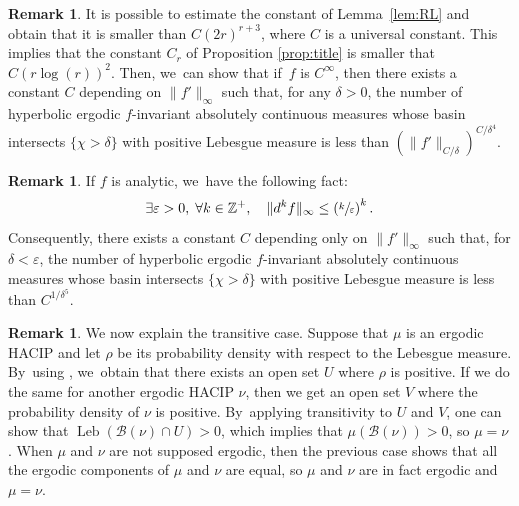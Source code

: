 \documentclass[11pt]{article}
\DeclareMathOperator{\Leb}{Leb}
\let\rC C
\theoremstyle{definition}
\newtheorem{rmq}[thm]{Remark}
\newcommand{\bbZ}{{\mathbb{Z}}}
\begin{document}
\begin{rmq}
It is possible to estimate the constant of Lemma~\ref{lem:RL} and obtain that it is smaller than $C (2r)^{r+3}$, where $C$ is a universal constant. This implies that the constant $C_r$ of Proposition \ref{prop:title} is smaller that $C (r \log(r))^2$. Then, we~can show that if~$f$ is $\rC^{\infty}$, then there exists a constant $C$ depending on $\| f' \|_{\infty}$ such that, for any $\delta > 0$, the number of hyperbolic ergodic $f$\nobreakdash-invariant absolutely continuous measures whose basin intersects $\{ \chi > \delta \}$ with positive Lebesgue measure is less than
$
\left (\| f' \|_{C/\delta} \right)^{C / \delta^4}
$.
\end{rmq}

\begin{rmq}
\label{rmq:analytic}
If $f$ is analytic, we~have the following fact:
\[
\exists \varepsilon > 0,\; \forall k \in \bbZ^+,\quad \| d^k f\|_{\infty} \leq \left (\sfrac{k}{\varepsilon} \right)^k.
\]
Consequently, there exists a constant $C$ depending only on $\| f' \|_{\infty}$ such that, for $\delta < \varepsilon$, the number of hyperbolic ergodic $f$\nobreakdash-invariant absolutely continuous measures whose basin intersects $\{ \chi > \delta \}$ with positive Lebesgue measure is less than
$
C^{1 / \delta^5}
$.
\end{rmq}

\begin{rmq}
\label{rmq:trans}
We now explain the transitive case. Suppose that $\mu$ is an ergodic HACIP and let $\rho$ be its probability density with respect to the Lebesgue measure. By~using \cite[Lem.\,VII.9.1]{SETE}, we~obtain that there exists an open set $U$ where $\rho$ is positive.
If we do the same for another ergodic HACIP $\nu$, then we get an open set $V$ where the probability density of $\nu$ is positive. By~applying transitivity to $U$ and $V$, one can show that $\Leb(\mathcal{B}(\nu) \cap U) > 0$, which implies that $\mu(\mathcal{B}(\nu)) > 0$, so $\mu=\nu$.
When $\mu$ and $\nu$ are not supposed ergodic, then the previous case shows that all the ergodic components of $\mu$ and $\nu$ are equal, so $\mu$ and $\nu$ are in fact ergodic and $\mu=\nu$.
\end{rmq}

\end{document}
